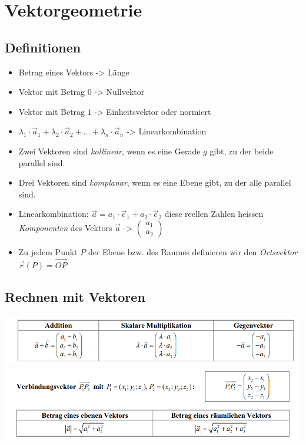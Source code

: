 \section{Vektorgeometrie}
\subsection{Definitionen}
\begin{itemize}
  \item Betrag eines Vektors -> Länge
  \item Vektor mit Betrag $0$ -> Nullvektor
  \item Vektor mit Betrag $1$ -> Einheitsvektor oder normiert
  \item $\lambda_1 \cdot \vec{a}_1 + \lambda_2 \cdot \vec{a}_2 + ... + \lambda_n \cdot \vec{a}_n$ -> Linearkombination
  \item Zwei Vektoren sind \textit{kollinear}, wenn es eine Gerade $g$ gibt, zu der beide parallel sind.
  \item Drei Vektoren sind \textit{komplanar}, wenn es eine Ebene gibt, zu der alle parallel sind.
  \item Linearkombination: $\vec{a} = a_1 \cdot \vec{e}_1 + a_2 \cdot \vec{e}_2$ diese reellen Zahlen heissen \textit{Komponenten} des Vektors $\vec{a}$ -> $\begin{pmatrix} a_1 \\ a_2 \end{pmatrix}$
  \item Zu jedem Punkt $P$ der Ebene bzw. des Raumes definieren wir den \textit{Ortsvektor} $\vec{r}(P)=\vec{OP}$
\end{itemize}

\subsection{Rechnen mit Vektoren}
\begin{center}
  \includegraphics[width=0.9\linewidth]{images/rechnen_vektor.png}
  \includegraphics[width=0.9\linewidth]{images/rechnen_vektor_zwei.png}
\end{center}

